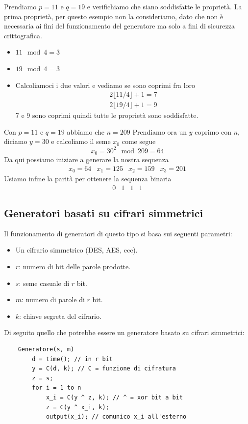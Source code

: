 \begin{example}
	Prendiamo $p = 11$ e $q = 19$ e verifichiamo che siano soddisfatte le propriet\`a. La prima propriet\`a, per questo
	esempio non la consideriamo, dato che non \`e necessaria ai fini del funzionamento del generatore ma solo a fini di
	sicurezza crittografica.
	\begin{itemize}
		\item $11 \mod{4} = 3$
		\item $19 \mod{4} = 3$
		\item Calcoliamoci i due valori e vediamo se sono coprimi fra loro
		      \begin{gather*}
			      2 \lfloor 11 / 4 \rfloor + 1 = 7 \\
			      2 \lfloor 19 / 4 \rfloor + 1 = 9
		      \end{gather*}
		      7 e 9 sono coprimi quindi tutte le propriet\`a sono soddisfatte.
	\end{itemize}
	Con $p = 11$ e $q = 19$ abbiamo che $n = 209$
	Prendiamo ora un $y$ coprimo con $n$, diciamo $y = 30$
	e calcoliamo il seme $x_0$ come segue
	\[ x_0 = 30^2 \mod{209} = 64 \]
	Da qui possiamo iniziare a generare la nostra sequenza
	\[ \begin{matrix} x_0 = 64 & x_1 = 125 & x_2 = 159 & x_3 = 201 \end{matrix} \]
	Usiamo infine la parit\`a per ottenere la sequenza binaria
	\[ \begin{matrix} 0 & 1 & 1 & 1 \end{matrix} \]
\end{example}

\subsection{Generatori basati su cifrari simmetrici}
Il funzionamento di generatori di questo tipo si basa sui seguenti parametri:
\begin{itemize}
	\item Un cifrario simmetrico (DES, AES, ecc).
	\item $r$: numero di bit delle parole prodotte.
	\item $s$: seme casuale di $r$ bit.
	\item $m$: numero di parole di $r$ bit.
	\item $k$: chiave segreta del cifrario.
\end{itemize}
Di seguito quello che potrebbe essere un generatore basato su cifrari simmetrici:
\begin{lstlisting}
	Generatore(s, m)
		d = time(); // in r bit 
		y = C(d, k); // C = funzione di cifratura 
		z = s;
		for i = 1 to n
			x_i = C(y ^ z, k); // ^ = xor bit a bit
			z = C(y ^ x_i, k);
			output(x_i); // comunico x_i all'esterno
\end{lstlisting}